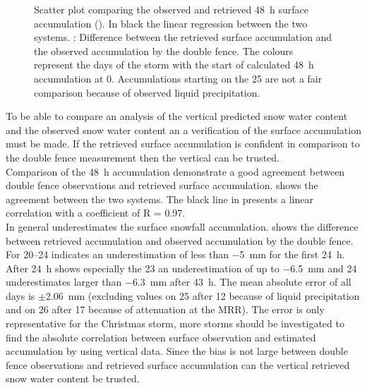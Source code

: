 \begin{figure}[t]
    \caption{Scatter plot comparing the observed and retrieved \SI{48}{\hour} surface accumulation (\protect{}).  In black the linear regression between the two systems. \protect{}: Difference between the retrieved surface accumulation and the observed accumulation by the double fence. The colours represent the days of the storm with the start of calculated \SI{48}{\hour} accumulation at \SI{0}{\UTC}. Accumulations starting on the \SI{25}{\dec} are not a fair comparison because of observed liquid precipitation. }\label{fig:res:obs_ret}
\end{figure}
To be able to compare an analysis of the vertical predicted snow water content and the observed snow water content an a verification of the surface accumulation must be made. If the retrieved surface accumulation is confident in comparison to the double fence measurement then the vertical can be trusted.
\\
Comparison of the \SI{48}{\hour} accumulation demonstrate a good agreement between double fence observations and retrieved surface accumulation.  shows the agreement between the two systems. The black line in  presents a linear correlation with a coefficient of R = \num{0.97}. 
\\
In general underestimates the surface snowfall accumulation.  shows the difference between retrieved accumulation and observed accumulation by the double fence. For \SIrange{20}{24}{\dec}  indicates an underestimation of less than \SI{-5}{\mm} for the first \SI{24}{\hour}. After \SI{24}{\hour} shows especially the \SI{23}{\dec} an underestimation of up to \SI{-6.5}{\mm} and \SI{24}{\dec} underestimates larger than \SI{-6.3}{\mm} after \SI{43}{\hour}. The mean absolute error of all days is $\pm$\SI{2.06}{\mm} (excluding values on \SI{25}{\dec} after \SI{12}{\UTC} because of liquid precipitation and on \SI{26}{\dec} after \SI{17}{\UTC} because of attenuation at the MRR). The error is only representative for the Christmas storm, more storms should be investigated to find the absolute correlation between surface observation and estimated accumulation by using vertical data.
Since the bias is not large between double fence observations and retrieved surface accumulation can the vertical retrieved snow water content be trusted. 


